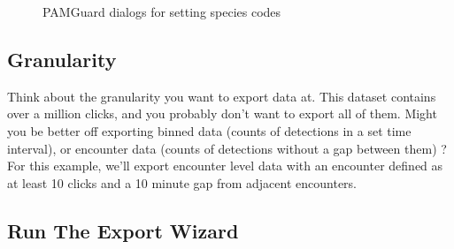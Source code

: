 \documentclass[
]{article}
\begin{document}
\begin{figure}
\begin{minipage}{0.49\linewidth}
{}


\end{minipage}%

\caption{\label{fig-species}PAMGuard dialogs for setting species codes}

\end{figure}%

\subsection{Granularity}\label{granularity}

Think about the granularity you want to export data at. This dataset
contains over a million clicks, and you probably don't want to export
all of them. Might you be better off exporting binned data (counts of
detections in a set time interval), or encounter data (counts of
detections without a gap between them) ? For this example, we'll export
encounter level data with an encounter defined as at least 10 clicks and
a 10 minute gap from adjacent encounters.

\subsection{Run The Export Wizard}\label{run-the-export-wizard-1}
\end{document}
